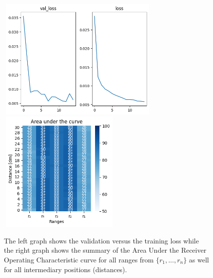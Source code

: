 \begin{multicols}{2}
\end{multicols}\begin{figure}[H]%
\centering
\includegraphics[width=8cm,height=6cm]{3_models/models_14/graph_14.png}
\hspace{0.2 cm}
\includegraphics[width=6cm,height=6cm]{4_plots/plots_14/AUC_14.png}
\caption{The left graph shows the validation versus the training loss while the right graph shows the summary of the Area Under the Receiver Operating Characteristic curve for all ranges from $\{r_{1}, ... ,r_{n}\}$ as well for all intermediary positions (distances).}
\label{auc_14}
\end{figure}

\newpage
